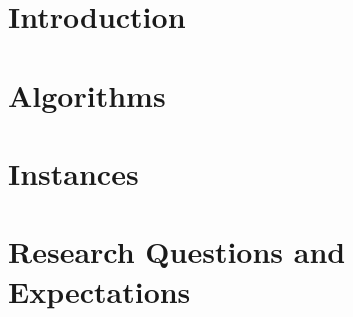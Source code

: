 \documentclass{article}
\author{Marcos Daniel Baroni}
\begin{document}
%
%

\section{Introduction}
\section{Algorithms}
\section{Instances}
\section{Research Questions and Expectations}
\end{document}
